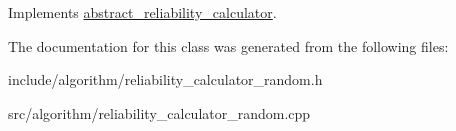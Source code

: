 Implements \hyperlink{classabstract__reliability__calculator_a4457d3eece3c873e2cc2455a6dfdbb88}{abstract\-\_\-reliability\-\_\-calculator}.



The documentation for this class was generated from the following files\-:\begin{DoxyCompactItemize}
\item 
include/algorithm/reliability\-\_\-calculator\-\_\-random.\-h\item 
src/algorithm/reliability\-\_\-calculator\-\_\-random.\-cpp\end{DoxyCompactItemize}

